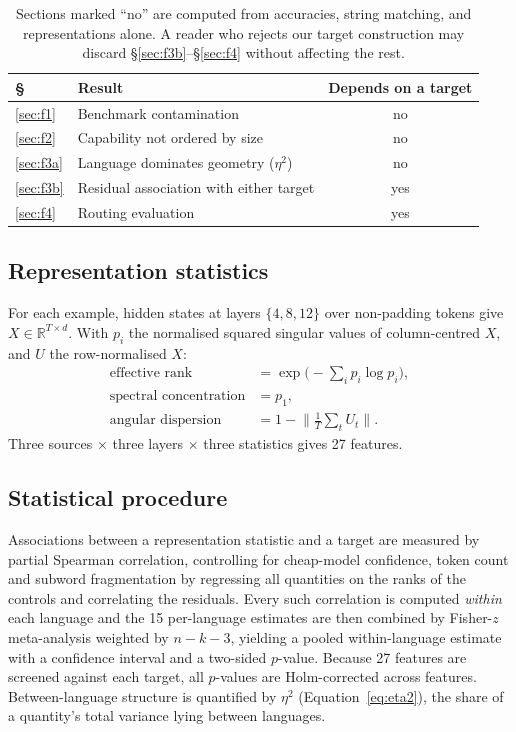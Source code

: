 \documentclass[11pt]{article}
\begin{document}
\begin{table}[t]
\centering
\small
\begin{tabular}{llc}
\toprule
\S & Result & Depends on a target \\
\midrule
\ref{sec:f1}  & Benchmark contamination        & no \\
\ref{sec:f2}  & Capability not ordered by size & no \\
\ref{sec:f3a} & Language dominates geometry ($\eta^2$) & no \\
\ref{sec:f3b} & Residual association with either target & yes \\
\ref{sec:f4}  & Routing evaluation             & yes \\
\bottomrule
\end{tabular}
\caption{Sections marked ``no'' are computed from accuracies, string matching,
and representations alone. A reader who rejects our target construction may
discard \S\ref{sec:f3b}--\S\ref{sec:f4} without affecting the rest.}
\label{tab:dependency}
\end{table}

\subsection{Representation statistics}
For each example, hidden states at layers $\{4,8,12\}$ over non-padding tokens
give $X \in \mathbb{R}^{T \times d}$. With $p_i$ the normalised squared singular
values of column-centred $X$, and $U$ the row-normalised $X$:
\begin{align*}
\text{effective rank} &= \exp\!\Big(-\textstyle\sum_i p_i \log p_i\Big),\\
\text{spectral concentration} &= p_1,\\
\text{angular dispersion} &= 1 - \big\lVert \tfrac{1}{T}\textstyle\sum_t U_t \big\rVert.
\end{align*}
Three sources $\times$ three layers $\times$ three statistics gives 27 features.

\subsection{Statistical procedure}
Associations between a representation statistic and a target are measured by
partial Spearman correlation, controlling for cheap-model confidence, token count
and subword fragmentation by regressing all quantities on the ranks of the
controls and correlating the residuals. Every such correlation is computed
\emph{within} each language and the 15 per-language estimates are then combined by
Fisher-$z$ meta-analysis weighted by $n - k - 3$, yielding a pooled within-language
estimate with a confidence interval and a two-sided $p$-value. Because 27 features
are screened against each target, all $p$-values are Holm-corrected across
features. Between-language structure is quantified by $\eta^2$
(Equation~\ref{eq:eta2}), the share of a quantity's total variance lying between
languages.
\end{document}
